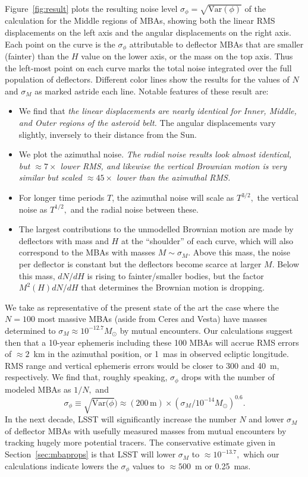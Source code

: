 \documentclass[linenumbers, onecolumn]{aastex631}
\newcommand{\Var}{\textrm{Var}}
\begin{document}
Figure~\ref{fig:result} plots the resulting noise level $\sigma_\phi=\sqrt{\Var(\phi)}$ of the calculation for the Middle regions of MBAs, showing both the linear RMS displacements on the left axis and the angular displacements on the right axis.  Each point on the curve is the $\sigma_\phi$ attributable to deflector MBAs that are smaller (fainter) than the $H$ value on the lower axis, or the mass on the top axis.  Thus the left-most point on each curve marks the total noise integrated over the full population of deflectors. Different color lines show the results for the values of $N$ and $\sigma_M$ as marked astride each line.  Notable features of these result are:
\begin{itemize}
\item We find that \emph{the linear displacements are nearly identical for Inner, Middle, and Outer regions of the asteroid belt.}  The angular displacements vary slightly, inversely to their distance from the Sun.
\item We plot the azimuthal noise.  \emph{The radial noise results look almost identical, but $\approx 7\times$ lower RMS, and likewise the vertical Brownian motion is  very similar but scaled $\approx45\times$ lower than the azimuthal RMS.}
\item For longer time periods $T$, the azimuthal noise will scale as
$T^{3/2},$ the vertical
noise as $T^{1/2},$ and the radial noise between these.
\item The largest contributions to the unmodelled Brownian motion are
made by deflectors with mass and $H$ at the ``shoulder'' of each
curve, which will also correspond to the MBAs with masses $M\sim
\sigma_M$.  Above this mass, the noise per deflector is constant but
the deflectors become scarce at larger $M.$ Below this mass, $dN/dH$
is rising to fainter/smaller bodies, but the factor $M^2(H) dN/dH$
that determines the Brownian motion is dropping.
\end{itemize}

We take as representative of the present state of the art the case
where the $N=100$ most massive MBAs (aside from Ceres and Vesta) have
masses determined to $\sigma_M\approx 10^{-12.7} M_\odot$ by mutual
encounters.  Our calculations suggest then that a 10-year ephemeris
including these 100 MBAs will accrue RMS errors of $\approx 2$~km in
the azimuthal position, or 1~mas in observed ecliptic longitude.
RMS range and vertical ephemeris errors would be closer to 300 and 40~m, respectively.  We find that, roughly speaking, $\sigma_\phi$
drops with the number of modeled MBAs as $1/N,$ and
\begin{equation} \sigma_\phi \equiv \sqrt{\Var(\phi}) \approx
(200\,\textrm{m}) \times \left(\sigma_M /
10^{-14}M_\odot\right)^{0.6}.
  \label{eq:varscale}
\end{equation}
 In the next decade, LSST will significantly
increase the number $N$ and lower $\sigma_M$ of deflector MBAs with
usefully measured masses from mutual encounters by tracking hugely
more potential tracers.  The conservative estimate given in Section~\ref{sec:mbaprops} is that LSST will lower $\sigma_M$ to $\approx10^{-13.7},$ which our calculations indicate lowers the $\sigma_\phi$ values to $\approx500$~m or 0.25~mas.
\end{document}
